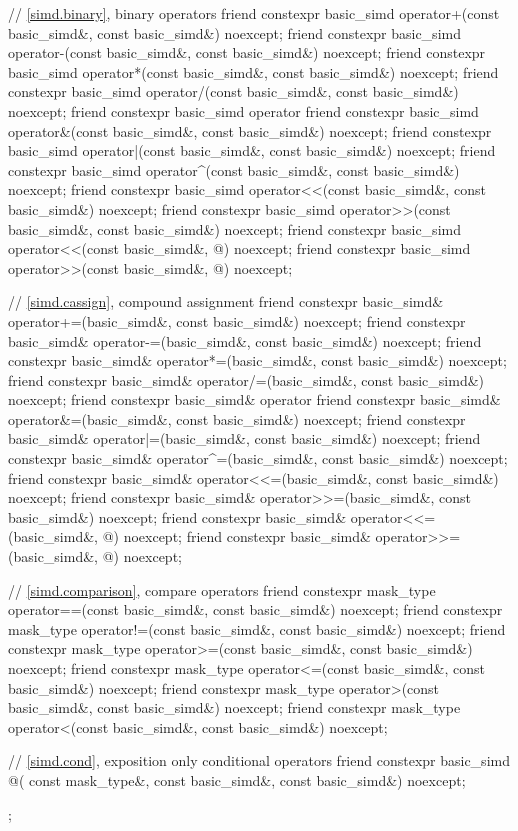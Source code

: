 \begin{codeblock}
{  // \ref{simd.binary},  binary operators
  friend constexpr basic_simd operator+(const basic_simd&, const basic_simd&) noexcept;
  friend constexpr basic_simd operator-(const basic_simd&, const basic_simd&) noexcept;
  friend constexpr basic_simd operator*(const basic_simd&, const basic_simd&) noexcept;
  friend constexpr basic_simd operator/(const basic_simd&, const basic_simd&) noexcept;
  friend constexpr basic_simd operator%
  friend constexpr basic_simd operator&(const basic_simd&, const basic_simd&) noexcept;
  friend constexpr basic_simd operator|(const basic_simd&, const basic_simd&) noexcept;
  friend constexpr basic_simd operator^(const basic_simd&, const basic_simd&) noexcept;
  friend constexpr basic_simd operator<<(const basic_simd&, const basic_simd&) noexcept;
  friend constexpr basic_simd operator>>(const basic_simd&, const basic_simd&) noexcept;
  friend constexpr basic_simd operator<<(const basic_simd&, @\simdsizetype@) noexcept;
  friend constexpr basic_simd operator>>(const basic_simd&, @\simdsizetype@) noexcept;

  // \ref{simd.cassign},  compound assignment
  friend constexpr basic_simd& operator+=(basic_simd&, const basic_simd&) noexcept;
  friend constexpr basic_simd& operator-=(basic_simd&, const basic_simd&) noexcept;
  friend constexpr basic_simd& operator*=(basic_simd&, const basic_simd&) noexcept;
  friend constexpr basic_simd& operator/=(basic_simd&, const basic_simd&) noexcept;
  friend constexpr basic_simd& operator%
  friend constexpr basic_simd& operator&=(basic_simd&, const basic_simd&) noexcept;
  friend constexpr basic_simd& operator|=(basic_simd&, const basic_simd&) noexcept;
  friend constexpr basic_simd& operator^=(basic_simd&, const basic_simd&) noexcept;
  friend constexpr basic_simd& operator<<=(basic_simd&, const basic_simd&) noexcept;
  friend constexpr basic_simd& operator>>=(basic_simd&, const basic_simd&) noexcept;
  friend constexpr basic_simd& operator<<=(basic_simd&, @\simdsizetype@) noexcept;
  friend constexpr basic_simd& operator>>=(basic_simd&, @\simdsizetype@) noexcept;

  // \ref{simd.comparison},  compare operators
  friend constexpr mask_type operator==(const basic_simd&, const basic_simd&) noexcept;
  friend constexpr mask_type operator!=(const basic_simd&, const basic_simd&) noexcept;
  friend constexpr mask_type operator>=(const basic_simd&, const basic_simd&) noexcept;
  friend constexpr mask_type operator<=(const basic_simd&, const basic_simd&) noexcept;
  friend constexpr mask_type operator>(const basic_simd&, const basic_simd&) noexcept;
  friend constexpr mask_type operator<(const basic_simd&, const basic_simd&) noexcept;

  // \ref{simd.cond},  exposition only conditional operators
  friend constexpr basic_simd @\simdselect@(
    const mask_type&, const basic_simd&, const basic_simd&) noexcept;
};
\end{codeblock}

